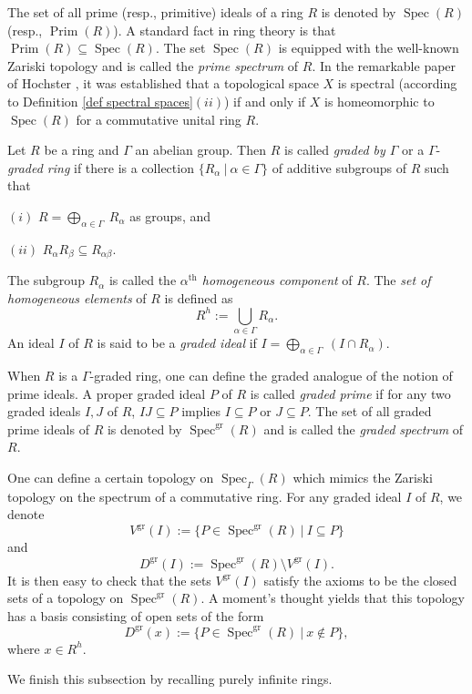 \documentclass[a4paper,reqno,12pt]{amsart}
\numberwithin{equation}{section}
\theoremstyle{definition}
\theoremstyle{remark}
\newcommand{\Prim}{\operatorname{Prim}}
\newcommand{\Spec}{\operatorname{Spec}}
\newcommand{\gr}{\operatorname{gr}}
\begin{document}
The set of all prime (resp., primitive) ideals of a ring $R$ is denoted by $\Spec(R)$ (resp., $\Prim(R)$). A standard fact in ring theory is that $\Prim(R)\subseteq \Spec(R)$. The set $\Spec(R)$ is equipped with the well-known Zariski topology and is called the \emph{prime spectrum} of $R$. In the remarkable paper of Hochster \cite{Hochster}, it was established that a topological space $X$ is spectral (according to Definition \ref{def spectral spaces}$(ii)$) if and only if $X$ is homeomorphic to $\Spec(R)$ for a commutative unital ring $R$. 

Let $R$ be a ring and $\Gamma$ an abelian group. Then $R$ is called \emph{graded by $\Gamma$} or a $\Gamma$-\emph{graded ring} if there is a collection $\{R_\alpha~|~\alpha\in \Gamma\}$ of additive subgroups of $R$ such that 

$(i)$ $R=\displaystyle{\bigoplus_{\alpha\in \Gamma}}~ R_\alpha$ as groups, and 

$(ii)$ $R_\alpha R_\beta\subseteq R_{\alpha\beta}$. 

The subgroup $R_\alpha$ is called the \emph{$\alpha^{\text{th}}$ homogeneous component} of $R$. The \emph{set of homogeneous elements} of $R$ is defined as \[R^h:=\displaystyle{\bigcup_{\alpha\in \Gamma}} R_\alpha.\] An ideal $I$ of $R$ is said to be a \emph{graded ideal} if $I=\displaystyle{\bigoplus_{\alpha\in \Gamma}}~(I\cap R_\alpha)$. 

When $R$ is a $\Gamma$-graded ring, one can define the graded analogue of the notion of prime ideals. A proper graded ideal $P$ of $R$ is called \emph{graded prime} if for any two graded ideals $I,J$ of $R$, $IJ\subseteq P$ implies $I\subseteq P$ or $J\subseteq P$. The set of all graded prime ideals of $R$ is denoted by $\Spec^{\gr}(R)$ and is called the \emph{graded spectrum} of $R$. 

One can define a certain topology on $\Spec_\Gamma(R)$ which mimics the Zariski topology on the spectrum of a commutative ring. For any graded ideal $I$ of $R$, we denote \[V^{\gr}(I):=\{P\in \Spec^{\gr}(R)~|~I\subseteq P\}\] and \[D^{\gr}(I):=\Spec^{\gr}(R)\setminus V^{\gr}(I).\] It is then easy to check that the sets $V^{\gr}(I)$ satisfy the axioms to be the closed sets of a topology on $\Spec^{\gr}(R)$. A moment's thought yields that this topology has a basis consisting of open sets of the form \[D^{\gr}(x):=\{P\in \Spec^{\gr}(R)~|~x\notin P\},\] where $x\in R^h$.   

We finish this subsection by recalling purely infinite rings.
\end{document}

